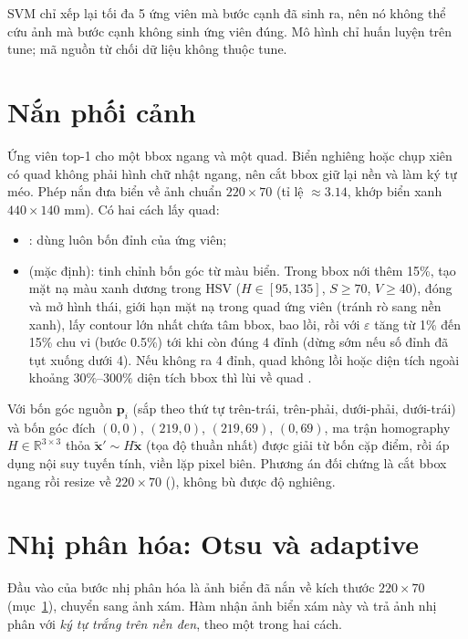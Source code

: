 SVM chỉ xếp lại tối đa 5 ứng viên mà bước cạnh đã sinh ra, nên nó không thể cứu ảnh mà bước cạnh không sinh ứng viên đúng. Mô hình chỉ huấn luyện trên tune; mã nguồn từ chối dữ liệu không thuộc tune.

\section{Nắn phối cảnh}
\label{sec:rectify}

Ứng viên top-1 cho một bbox ngang và một quad. Biển nghiêng hoặc chụp xiên có quad không phải hình chữ nhật ngang, nên cắt bbox giữ lại nền và làm ký tự méo. Phép nắn đưa biển về ảnh chuẩn $220\times 70$ (tỉ lệ $\approx 3.14$, khớp biển xanh $440\times 140$ mm). Có hai cách lấy quad:
\begin{itemize}
  \item {}: dùng luôn bốn đỉnh  của ứng viên;
  \item {} (mặc định): tinh chỉnh bốn góc từ màu biển. Trong bbox nới thêm 15\%, tạo mặt nạ màu xanh dương trong HSV ($H\in[95,135]$, $S\ge 70$, $V\ge 40$), đóng và mở hình thái, giới hạn mặt nạ trong quad ứng viên (tránh rò sang nền xanh), lấy contour lớn nhất chứa tâm bbox, bao lồi, rồi  với $\varepsilon$ tăng từ 1\% đến 15\% chu vi (bước 0.5\%) tới khi còn đúng 4 đỉnh (dừng sớm nếu số đỉnh đã tụt xuống dưới 4). Nếu không ra 4 đỉnh, quad không lồi hoặc diện tích ngoài khoảng $30\%$--$300\%$ diện tích bbox thì lùi về quad .
\end{itemize}
Với bốn góc nguồn $\mathbf{p}_i$ (sắp theo thứ tự trên-trái, trên-phải, dưới-phải, dưới-trái) và bốn góc đích $(0,0)$, $(219,0)$, $(219,69)$, $(0,69)$, ma trận homography $H\in\mathbb{R}^{3\times 3}$ thỏa $\tilde{\mathbf{x}}'\sim H\tilde{\mathbf{x}}$ (tọa độ thuần nhất) được giải từ bốn cặp điểm, rồi áp dụng nội suy tuyến tính, viền lặp pixel biên. Phương án đối chứng là cắt bbox ngang rồi resize về $220\times 70$ (), không bù được độ nghiêng.

\section{Nhị phân hóa: Otsu và adaptive}
\label{sec:binarize}

Đầu vào của bước nhị phân hóa là ảnh biển đã nắn về kích thước $220\times 70$ (mục~\ref{sec:rectify}), chuyển sang ảnh xám. Hàm  nhận ảnh biển xám này và trả ảnh nhị phân với \emph{ký tự trắng trên nền đen}, theo một trong hai cách.

